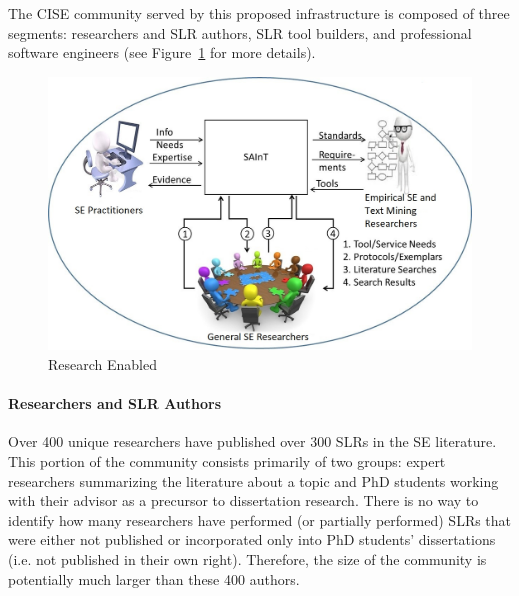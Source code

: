 The CISE community served by this proposed infrastructure is composed of three segments: researchers and SLR authors, SLR tool builders, and professional software engineers (see Figure~\ref{figure-ResearchEnabled} for more details).

\begin{figure}
	\centering
	\includegraphics[width=4.5in]{ResearchEnabled}
	\caption{Research Enabled}
	\label{figure-ResearchEnabled}
\end{figure}

\paragraph{Researchers and SLR Authors}
Over 400 unique researchers have published over 300 SLRs in the SE literature.
This portion of the community consists primarily of two groups: expert researchers summarizing the literature about a topic and PhD students working with their advisor as a precursor to dissertation research.
There is no way to identify how many researchers have performed (or partially performed) SLRs that were either not published or incorporated only into PhD students' dissertations (i.e. not published in their own right).
Therefore, the size of the community is potentially much larger than these 400 authors.


